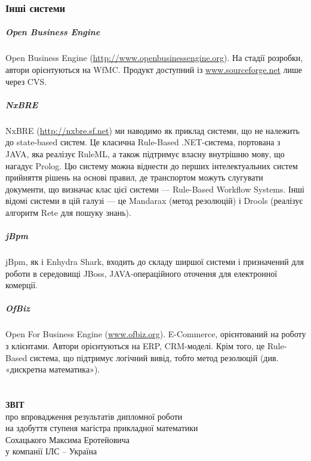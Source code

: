 \documentclass{memoir}
\begin{document}
\subsection{Інші системи}

\paragraph{Open Business Engine}

Open Business Engine (\url{http://www.openbusinessengine.org}). На стадії розробки, автори орієнтуються на WfMC. Продукт доступний із \url{www.sourceforge.net} лише через CVS.

\paragraph{NxBRE}

NxBRE (\url{http://nxbre.sf.net}) ми наводимо як приклад системи, що не належить до state-based систем. Це класична Rule-Based .NET-система, портована з JAVA, яка реалізує RuleML, а також підтримує власну внутрішню мову, що нагадує Prolog. Цю систему можна віднести до перших інтелектуальних систем прийняття рішень на основі правил, де транспортом можуть слугувати документи, що визначає клас цієї системи — Rule-Based Workflow Systems. Інші відомі системи в цій галузі — це Mandarax (метод резолюцій) і Drools (реалізує алгоритм Rete для пошуку знань).

\paragraph{jBpm}

jBpm, як і Enhydra Shark, входить до складу ширшої системи і призначений для роботи в середовищі JBoss, JAVA-операційного оточення для електронної комерції.

\paragraph{OfBiz}

Open For Business Engine (\url{www.ofbiz.org}). E-Commerce, орієнтований на роботу з клієнтами. Автори орієнтуються на ERP, CRM-моделі. Крім того, це Rule-Based система, що підтримує логічний вивід, тобто метод резолюцій (див. «дискретна математика»).

\newpage
\chapter*{}
\begin{center}
    {\large \textbf{ЗВІТ}}\\[0.3cm]
    {\normalsize про впровадження результатів дипломної роботи}\\
    {\normalsize на здобуття ступеня магістра прикладної математики}\\
    {\normalsize Сохацького Максима Еротейовича}\\
    {\normalsize у компанії ІЛС – Україна}\\[1cm]
\end{center}
\end{document}
